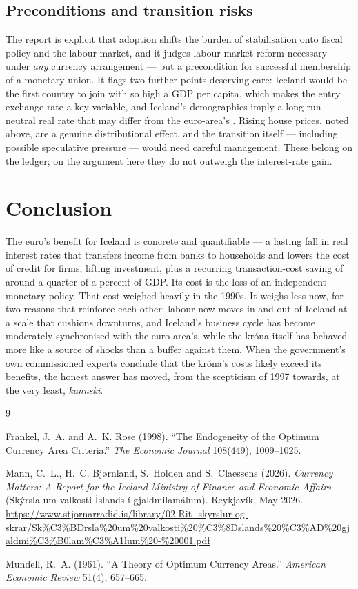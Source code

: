 \documentclass[11pt,a4paper]{article}
\begin{document}
\subsection{Preconditions and transition risks}
The report is explicit that adoption shifts the burden of stabilisation onto
fiscal policy and the labour market, and it judges labour-market reform
necessary under \emph{any} currency arrangement --- but a precondition for
successful membership of a monetary union. It flags two further points
deserving care: Iceland would be the first country to join with so high a GDP
per capita, which makes the entry exchange rate a key variable, and Iceland's
demographics imply a long-run neutral real rate that may differ from the
euro-area's \citep{mann2026}. Rising house prices, noted above, are a genuine
distributional effect, and the transition itself --- including possible
speculative pressure --- would need careful management. These belong on the
ledger; on the argument here they do not outweigh the interest-rate gain.

\section{Conclusion}
The euro's benefit for Iceland is concrete and quantifiable --- a lasting fall
in real interest rates that transfers income from banks to households and
lowers the cost of credit for firms, lifting investment, plus a recurring
transaction-cost saving of around a quarter of a percent of GDP. Its cost is
the loss of an independent monetary policy. That cost weighed heavily in the
1990s. It weighs less now, for two reasons that reinforce each other: labour
now moves in and out of Iceland at a scale that cushions downturns, and
Iceland's business cycle has become moderately synchronised with the euro
area's, while the kr\'ona itself has behaved more like a source of shocks than
a buffer against them. When the government's own commissioned experts conclude
that the kr\'ona's costs likely exceed its benefits, the honest answer has
moved, from the scepticism of 1997 towards, at the very least, \emph{kannski}.

\begin{thebibliography}{9}

Frankel, J.~A. and A.~K. Rose (1998). ``The Endogeneity of the Optimum
Currency Area Criteria.'' \emph{The Economic Journal} 108(449), 1009--1025.

Mann, C.~L., H.~C. Bj{\o}rnland, S.~Holden and S.~Claessens (2026).
\emph{Currency Matters: A Report for the Iceland Ministry of Finance and
Economic Affairs} (Sk\'yrsla um valkosti \'Islands \'i gjaldmi\dh lam\'alum).
Reykjav\'ik, May 2026.
\url{https://www.stjornarradid.is/library/02-Rit--skyrslur-og-skrar/Sk%C3%BDrsla%20um%20valkosti%20%C3%8Dslands%20%C3%AD%20gjaldmi%C3%B0lam%C3%A1lum%20-%20001.pdf}

Mundell, R.~A. (1961). ``A Theory of Optimum Currency Areas.''
\emph{American Economic Review} 51(4), 657--665.

\end{thebibliography}
\end{document}
